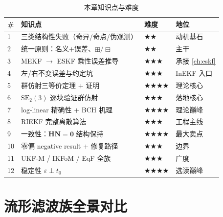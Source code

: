 \begin{table}[H]\centering\small
\caption{本章知识点与难度}
\begin{tabular}{llll}
\toprule
\# & 知识点 & 难度 & 地位 \\
\midrule
1 & 三类结构性失败（奇异/奇点/伪观测） & $\bigstar\bigstar$ & 动机基石 \\
2 & 统一原则：名义$+$误差、$\boxplus/\boxminus$ & $\bigstar\bigstar$ & 主干 \\
3 & MEKF $\to$ ESKF 乘性误差推导 & $\bigstar\bigstar\bigstar$ & 承接 \cref{ch:eskf} \\
4 & 左/右不变误差与约定坑 & $\bigstar\bigstar\bigstar$ & InEKF 入口 \\
5 & 群仿射三等价定理 $+$ 证明 & $\bigstar\bigstar\bigstar\bigstar$ & 理论核心 \\
6 & $\mathrm{SE}_2(3)$ 逐块验证群仿射 & $\bigstar\bigstar\bigstar$ & 落地核心 \\
7 & log-linear 精确性 $+$ BCH 机理 & $\bigstar\bigstar\bigstar\bigstar$ & 理论巅峰 \\
8 & RIEKF 完整离散算法 & $\bigstar\bigstar\bigstar$ & 工程主线 \\
9 & 一致性：$\mathbf{H}\mathbf{N}=\mathbf{0}$ 结构保持 & $\bigstar\bigstar\bigstar\bigstar$ & 最大卖点 \\
10 & 零偏 negative result $+$ 修复路径 & $\bigstar\bigstar\bigstar$ & 边界 \\
11 & UKF-M / IKFoM / EqF 全族 & $\bigstar\bigstar\bigstar$ & 广度 \\
12 & 稳定性 $\varepsilon\perp t_0$ & $\bigstar\bigstar\bigstar\bigstar$ & 选读巅峰 \\
\bottomrule
\end{tabular}
\end{table}

\section*{流形滤波族全景对比}

